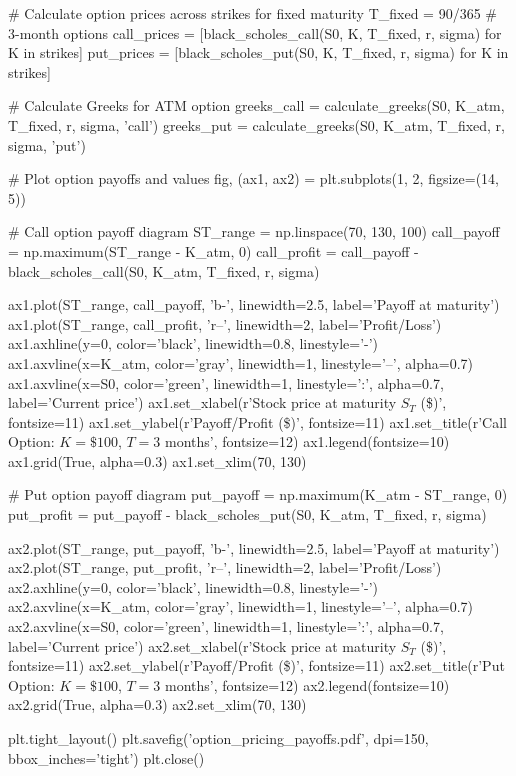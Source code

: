 \documentclass[a4paper, 11pt]{article}
\begin{document}
\begin{pycode}
# Calculate option prices across strikes for fixed maturity
T_fixed = 90/365  # 3-month options
call_prices = [black_scholes_call(S0, K, T_fixed, r, sigma) for K in strikes]
put_prices = [black_scholes_put(S0, K, T_fixed, r, sigma) for K in strikes]

# Calculate Greeks for ATM option
greeks_call = calculate_greeks(S0, K_atm, T_fixed, r, sigma, 'call')
greeks_put = calculate_greeks(S0, K_atm, T_fixed, r, sigma, 'put')

# Plot option payoffs and values
fig, (ax1, ax2) = plt.subplots(1, 2, figsize=(14, 5))

# Call option payoff diagram
ST_range = np.linspace(70, 130, 100)
call_payoff = np.maximum(ST_range - K_atm, 0)
call_profit = call_payoff - black_scholes_call(S0, K_atm, T_fixed, r, sigma)

ax1.plot(ST_range, call_payoff, 'b-', linewidth=2.5, label='Payoff at maturity')
ax1.plot(ST_range, call_profit, 'r--', linewidth=2, label='Profit/Loss')
ax1.axhline(y=0, color='black', linewidth=0.8, linestyle='-')
ax1.axvline(x=K_atm, color='gray', linewidth=1, linestyle='--', alpha=0.7)
ax1.axvline(x=S0, color='green', linewidth=1, linestyle=':', alpha=0.7, label='Current price')
ax1.set_xlabel(r'Stock price at maturity $S_T$ (\$)', fontsize=11)
ax1.set_ylabel(r'Payoff/Profit (\$)', fontsize=11)
ax1.set_title(r'Call Option: $K=\$100$, $T=3$ months', fontsize=12)
ax1.legend(fontsize=10)
ax1.grid(True, alpha=0.3)
ax1.set_xlim(70, 130)

# Put option payoff diagram
put_payoff = np.maximum(K_atm - ST_range, 0)
put_profit = put_payoff - black_scholes_put(S0, K_atm, T_fixed, r, sigma)

ax2.plot(ST_range, put_payoff, 'b-', linewidth=2.5, label='Payoff at maturity')
ax2.plot(ST_range, put_profit, 'r--', linewidth=2, label='Profit/Loss')
ax2.axhline(y=0, color='black', linewidth=0.8, linestyle='-')
ax2.axvline(x=K_atm, color='gray', linewidth=1, linestyle='--', alpha=0.7)
ax2.axvline(x=S0, color='green', linewidth=1, linestyle=':', alpha=0.7, label='Current price')
ax2.set_xlabel(r'Stock price at maturity $S_T$ (\$)', fontsize=11)
ax2.set_ylabel(r'Payoff/Profit (\$)', fontsize=11)
ax2.set_title(r'Put Option: $K=\$100$, $T=3$ months', fontsize=12)
ax2.legend(fontsize=10)
ax2.grid(True, alpha=0.3)
ax2.set_xlim(70, 130)

plt.tight_layout()
plt.savefig('option_pricing_payoffs.pdf', dpi=150, bbox_inches='tight')
plt.close()
\end{pycode}
\end{document}

